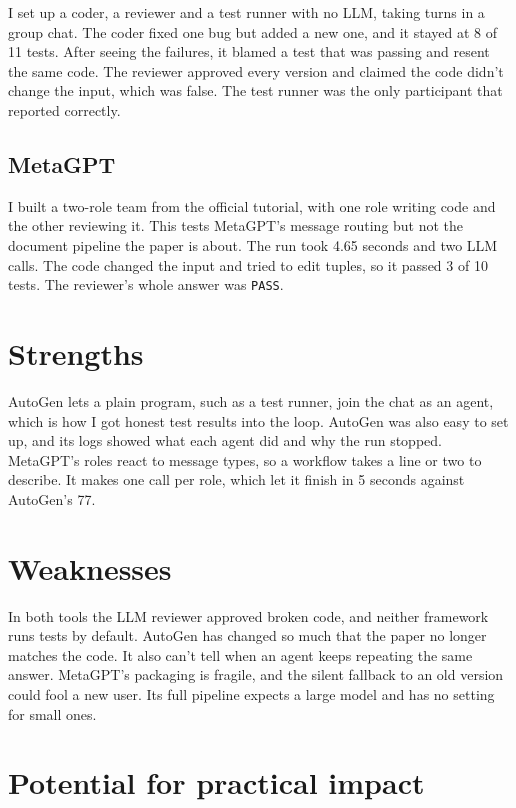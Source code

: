 \documentclass[11pt]{article}
\begin{document}
I set up a coder, a reviewer and a test runner with no LLM, taking turns in a group chat. The coder fixed one bug but added a new one, and it stayed at 8 of 11 tests. After seeing the failures, it blamed a test that was passing and resent the same code. The reviewer approved every version and claimed the code didn't change the input, which was false. The test runner was the only participant that reported correctly.

\subsection*{MetaGPT}

I built a two-role team from the official tutorial, with one role writing code and the other reviewing it. This tests MetaGPT's message routing but not the document pipeline the paper is about. The run took 4.65 seconds and two LLM calls. The code changed the input and tried to edit tuples, so it passed 3 of 10 tests. The reviewer's whole answer was \texttt{PASS}.

\section{Strengths}

AutoGen lets a plain program, such as a test runner, join the chat as an agent, which is how I got honest test results into the loop. AutoGen was also easy to set up, and its logs showed what each agent did and why the run stopped. MetaGPT's roles react to message types, so a workflow takes a line or two to describe. It makes one call per role, which let it finish in 5 seconds against AutoGen's 77.

\section{Weaknesses}

In both tools the LLM reviewer approved broken code, and neither framework runs tests by default. AutoGen has changed so much that the paper no longer matches the code. It also can't tell when an agent keeps repeating the same answer. MetaGPT's packaging is fragile, and the silent fallback to an old version could fool a new user. Its full pipeline expects a large model and has no setting for small ones.

\section{Potential for practical impact}
\end{document}
